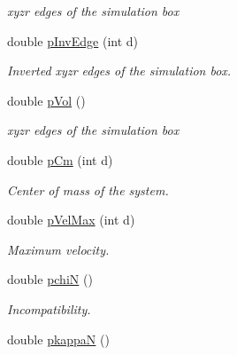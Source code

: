 \begin{DoxyCompactItemize}
\begin{DoxyCompactList}\small\item\em xyzr edges of the simulation box \end{DoxyCompactList}\item 
\hypertarget{classVarData_a33833c025a5c9bf7ad5abab2cf9b1dac}{double \hyperlink{classVarData_a33833c025a5c9bf7ad5abab2cf9b1dac}{p\-Inv\-Edge} (int d)}\label{classVarData_a33833c025a5c9bf7ad5abab2cf9b1dac}

\begin{DoxyCompactList}\small\item\em \-Inverted xyzr edges of the simulation box. \end{DoxyCompactList}\item 
\hypertarget{classVarData_a3ccdbc4515f1de45728ef36368b9969a}{double \hyperlink{classVarData_a3ccdbc4515f1de45728ef36368b9969a}{p\-Vol} ()}\label{classVarData_a3ccdbc4515f1de45728ef36368b9969a}

\begin{DoxyCompactList}\small\item\em xyzr edges of the simulation box \end{DoxyCompactList}\item 
\hypertarget{classVarData_adfa118e0505b98efdcaf18dbd72cc11e}{double \hyperlink{classVarData_adfa118e0505b98efdcaf18dbd72cc11e}{p\-Cm} (int d)}\label{classVarData_adfa118e0505b98efdcaf18dbd72cc11e}

\begin{DoxyCompactList}\small\item\em \-Center of mass of the system. \end{DoxyCompactList}\item 
\hypertarget{classVarData_a0dd67b71b3296325972cd737b82f53c3}{double \hyperlink{classVarData_a0dd67b71b3296325972cd737b82f53c3}{p\-Vel\-Max} (int d)}\label{classVarData_a0dd67b71b3296325972cd737b82f53c3}

\begin{DoxyCompactList}\small\item\em \-Maximum velocity. \end{DoxyCompactList}\item 
\hypertarget{classVarData_a8def89edf23019d700fdbadb476e4c0a}{double \hyperlink{classVarData_a8def89edf23019d700fdbadb476e4c0a}{pchi\-N} ()}\label{classVarData_a8def89edf23019d700fdbadb476e4c0a}

\begin{DoxyCompactList}\small\item\em \-Incompatibility. \end{DoxyCompactList}\item 
\hypertarget{classVarData_af410b05a34ef11ae5d26090a7706493b}{double \hyperlink{classVarData_af410b05a34ef11ae5d26090a7706493b}{pkappa\-N} ()}\label{classVarData_af410b05a34ef11ae5d26090a7706493b}


\end{DoxyCompactItemize}
